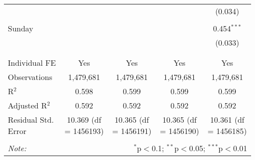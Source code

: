 \documentclass[
]{article}
\begin{document}
\begin{table}[!htbp]
{\begin{tabular}{@{\extracolsep{5pt}}lcccc}
  &  &  &  & (0.034) \\ 
  & & & & \\ 
 Sunday &  &  &  & 0.454$^{***}$ \\ 
  &  &  &  & (0.033) \\ 
  & & & & \\ 
\hline \\[-1.8ex] 
Individual FE & Yes & Yes & Yes & Yes \\ 
Observations & 1,479,681 & 1,479,681 & 1,479,681 & 1,479,681 \\ 
R$^{2}$ & 0.598 & 0.599 & 0.599 & 0.599 \\ 
Adjusted R$^{2}$ & 0.592 & 0.592 & 0.592 & 0.592 \\ 
Residual Std. Error & 10.369 (df = 1456193) & 10.365 (df = 1456191) & 10.365 (df = 1456190) & 10.361 (df = 1456185) \\ 
\hline 
\hline \\[-1.8ex] 
\textit{Note:}  & \multicolumn{4}{r}{$^{*}$p$<$0.1; $^{**}$p$<$0.05; $^{***}$p$<$0.01} \\ 
\end{tabular}
} 
\end{table} 
\newpage
\end{document}
